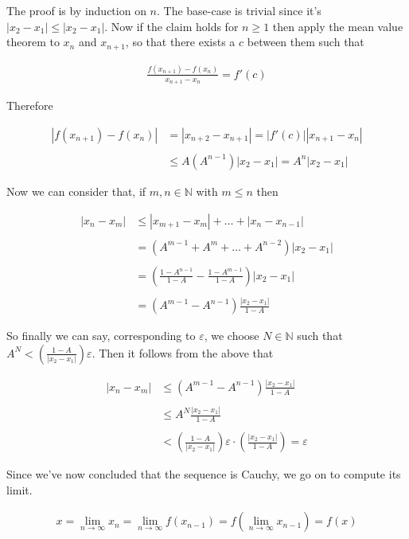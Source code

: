 \documentclass{article}
\begin{document}
  The proof is by induction on $n$.  The base-case is trivial since it's $|x_2-x_1|\leq |x_2-x_1|$.  Now if the claim holds for $n\geq 1$ then apply the mean value theorem to $x_{n}$ and $x_{n+1}$, so that there exists a $c$ between them such that

  \begin{align*}
    \frac{f(x_{n+1})-f(x_n)}{x_{n+1}-x_{n}} = f'(c)
  \end{align*}

  Therefore

  \begin{align*}
    |f(x_{n+1})-f(x_n)| &= |x_{n+2}-x_{n+1}| = |f'(c)||x_{n+1}-x_n| \\\\
    &\leq A(A^{n-1})|x_2-x_1| = A^n|x_2-x_1|
  \end{align*}

  Now we can consider that, if $m,n\in\mathbb N$ with $m \leq n$ then

  \begin{align*}
    |x_n-x_m| &\leq |x_{m+1}-x_m|+\dots+|x_n-x_{n-1}| \\\\
    &= (A^{m-1}+A^{m}+\dots+A^{n-2})|x_2-x_1| \\\\
    &= \left(\frac{1-A^{n-1}}{1-A}-\frac{1-A^{m-1}}{1-A}\right)|x_2-x_1| \\\\
    &= (A^{m-1}-A^{n-1})\frac{|x_2-x_1|}{1-A}
  \end{align*}

  So finally we can say, corresponding to $\varepsilon$, we choose $N\in\mathbb N$ such that $A^N < \left(\frac{1-A}{|x_2-x_1|}\right)\varepsilon$.  Then it follows from the above that

  \begin{align*}
    |x_n-x_m| &\leq (A^{m-1}-A^{n-1})\frac{|x_2-x_1|}{1-A} \\\\
    &\leq A^N\frac{|x_2-x_1|}{1-A} \\\\
    &< \left(\frac{1-A}{|x_2-x_1|}\right)\varepsilon \cdot \left(\frac{|x_2-x_1|}{1-A}\right) = \varepsilon
  \end{align*}

  Since we've now concluded that the sequence is Cauchy, we go on to compute its limit.

  \begin{align*}
    x = \lim_{n\to \infty}x_n = \lim_{n\to \infty}f(x_{n-1}) = f\left(\lim_{n\to \infty}x_{n-1}\right) = f(x)
  \end{align*}
\end{document}
